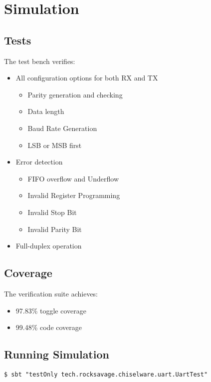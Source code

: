 \section{Simulation}
\subsection{Tests}
The test bench verifies:
\begin{itemize}
  \item All configuration options for both RX and TX
    \begin{itemize}
      \item Parity generation and checking
      \item Data length
      \item Baud Rate Generation
      \item LSB or MSB first
    \end{itemize}

  \item Error detection
    \begin{itemize}
        \item FIFO overflow and Underflow
        \item Invalid Register Programming
        \item Invalid Stop Bit
        \item Invalid Parity Bit
      \end{itemize}
  \item Full-duplex operation
\end{itemize}

\subsection{Coverage}
The verification suite achieves:
\begin{itemize}
  \item 97.83\% toggle coverage
  \item 99.48\% code coverage
\end{itemize}

\subsection{Running Simulation}
\begin{verbatim}
$ sbt "testOnly tech.rocksavage.chiselware.uart.UartTest"
\end{verbatim}